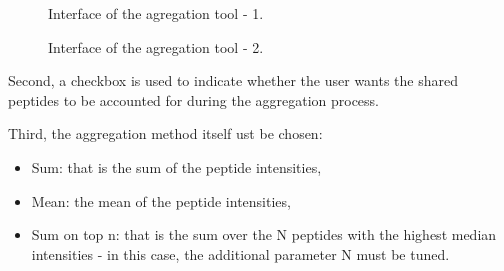 \documentclass[12pt]{article}
\begin{document}
{\begin {figure}
\centering
{}
\caption{Interface of the agregation tool - 1.}\label{fig:agreg1}
\end {figure}

\begin {figure}
\centering
{}
\caption{Interface of the agregation tool - 2.}\label{fig:agreg2}
\end {figure}


Second, a checkbox is used to indicate whether the user wants the shared 
peptides to be accounted for during the aggregation process.

Third, the aggregation method itself ust be chosen: 
\begin{itemize}
\item Sum: that is the sum of the peptide intensities,
\item Mean: the mean of the peptide intensities,
\item Sum on top n: that is the sum over the N peptides with the highest median 
intensities - in this case, the additional parameter N must be tuned.
\end{itemize}

}
\end{document}
